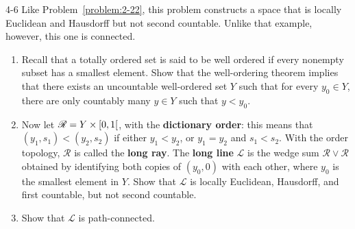 \begin{problem}{4-6}
Like Problem~\ref{problem:2-22}, this problem constructs a space that is locally Euclidean and Hausdorff but not second countable. Unlike that example, however, this one is connected.
\begin{enumerate}[label={(\alph*)}]
	\item Recall that a totally ordered set is said to be well ordered if every nonempty subset has a smallest element. Show that the well-ordering theorem implies that there exists an uncountable well-ordered set $Y$ such that for every $y_{0}\in Y$, there are only countably many $y\in Y$ such that $y < y_{0}$.
	\item Now let $\mathscr{R} = Y \times \left[{0,1}\right[$, with the \textbf{dictionary order}: this means that $(y_{1}, s_{1}) < (y_{2}, s_{2})$ if either $y_{1} < y_{2}$, or $y_{1} = y_{2}$ and $s_{1} < s_{2}$. With the order topology, $\mathscr{R}$ is called the \textbf{long ray}. The \textbf{long line} $\mathscr{L}$ is the wedge sum $\mathscr{R}\vee \mathscr{R}$ obtained by identifying both copies of $(y_{0}, 0)$ with each other, where $y_{0}$ is the smallest element in $Y$. Show that $\mathscr{L}$ is locally Euclidean, Hausdorff, and first countable, but not second countable.
	\item Show that $\mathscr{L}$ is path-connected.
\end{enumerate}
\end{problem}

